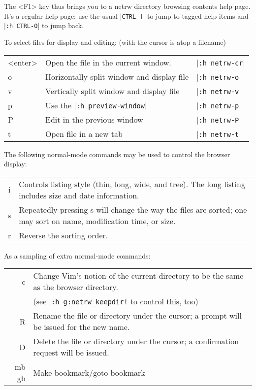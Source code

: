 The <F1> key thus brings you to a netrw directory browsing contents help page.
It's a regular help page; use the usual |\texttt{CTRL-]}| to jump to tagged help items and |\texttt{:h CTRL-O}| to jump back.

To select files for display and editing: (with the cursor is atop a filename)

\begin{center} \begin{longtable}{l l l}
				<enter> & Open the file in the current window. & |\texttt{:h netrw-cr}| \\
				o & Horizontally split window and display file & |\texttt{:h netrw-o}| \\
				v & Vertically split window and display file & |\texttt{:h netrw-v}| \\
				p & Use the |\texttt{:h preview-window}| & |\texttt{:h netrw-p}| \\
				P & Edit in the previous window & |\texttt{:h netrw-P}| \\
				t & Open file in a new tab & |\texttt{:h netrw-t}|
\end{longtable} \end{center}

The following normal-mode commands may be used to control the browser display:

\begin{center} \begin{tabularx}{\textwidth}{c X}
				i & Controls listing style (thin, long, wide, and tree).  The long listing includes size and date information. \\
				s & Repeatedly pressing s will change the way the files are sorted; one may sort on name, modification time, or size. \\
				r & Reverse the sorting order. \\

\end{tabularx} \end{center}

As a sampling of extra normal-mode commands:

\begin{center} \begin{tabularx}{\textwidth}{r X}
				c & Change Vim's notion of the current directory to be the same as the browser directory.\\
				  & (see |\texttt{:h g:netrw\_keepdir!} to control this, too) \\
				R & Rename the file or directory under the cursor; a prompt will be issued for the new name.\\
				D & Delete the file or directory under the cursor; a confirmation request will be issued.\\
				mb gb & Make bookmark/goto bookmark\\
\end{tabularx} \end{center}


